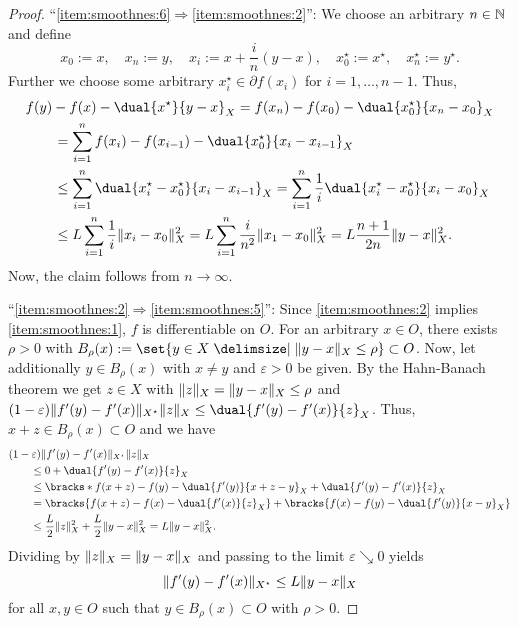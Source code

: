 \documentclass[
	english
]{scrartcl}
\numberwithin{equation}{section} %
\providecommand\given{\nonscript\;\delimsize|\nonscript\;\mathopen{}}
\DeclarePairedDelimiter\norm{\lVert}{\rVert}
\DeclarePairedDelimiter\bracks[]
\newcommand\N{\mathbb{N}}
\newcommand{\dualspace}{^\star}
\begin{document}
\begin{proof}
	``\ref{item:smoothnes:6}$\Rightarrow$\ref{item:smoothnes:2}'':
	We choose an arbitrary $n \in \N$ and define
	\begin{equation*}
		x_0 := x,
		\quad
		x_n := y,
		\quad
		x_i := x + \frac{i}{n} (y - x),
		\quad
		x_0\dualspace := x\dualspace,
		\quad
		x_n\dualspace := y\dualspace
		.
	\end{equation*}
	Further we choose some arbitrary
	$x_i\dualspace \in \partial f(x_i)$ for $i = 1,\ldots, n-1$.
	Thus,
	\begin{align*}
		&f(y) - f(x) - \dual{x\dualspace}{y - x}_X
		=
		f(x_n) - f(x_0) - \dual{x_0\dualspace}{x_n - x_0}_X
		\\&\qquad
		=
		\sum_{i = 1}^n f(x_i) - f(x_{i-1}) - \dual{x_0\dualspace}{x_i - x_{i-1}}_X
		\\&\qquad
		\le
		\sum_{i = 1}^n \dual{x_i\dualspace - x_0\dualspace}{x_i - x_{i-1}}_X
		=
		\sum_{i = 1}^n \frac{1}{i} \dual{x_i\dualspace - x_0\dualspace}{x_i - x_0}_X
		\\&\qquad
		\le
		L \sum_{i = 1}^n \frac{1}{i} \norm{x_i - x_0}_X^2
		=
		L \sum_{i = 1}^n \frac{i}{n^2} \norm{x_1 - x_0}_X^2
		=
		L \frac{n+1}{2 n} \norm{y - x}_X^2
		.
	\end{align*}
	Now, the claim follows from $n \to \infty$.

	``\ref{item:smoothnes:2}$\Rightarrow$\ref{item:smoothnes:5}'':
	Since \ref{item:smoothnes:2} implies \ref{item:smoothnes:1},
	$f$ is differentiable on $O$.
	For an arbitrary $x \in O$, there exists $\rho > 0$
	with $B_\rho(x) := \set{y \in X \given \norm{y - x}_X \le \rho } \subset O$.
	Now, let additionally $y \in B_\rho(x)$ with $x \ne y$ and $\varepsilon > 0$
	be given.
	By the Hahn-Banach theorem we get $z \in X$ with $\norm{z}_X = \norm{y - x}_X \le \rho$
	and
	$(1-\varepsilon) \norm{f'(y) - f'(x)}_{X\dualspace} \norm{z}_X \le \dual{f'(y) - f'(x)}{z}_X$.
	Thus, $x + z \in B_\rho(x) \subset O$
	and we have
	\begin{align*}
		&(1-\varepsilon) \norm{f'(y) - f'(x)}_{X\dualspace} \norm{z}_X
		\\
		&\qquad\le 0 + \dual{f'(y) - f'(x)}{z}_X
		\\
		&\qquad\le
		\bracks*{f(x + z) - f(y) - \dual{f'(y)}{x+z-y}_X} + \dual{f'(y) - f'(x)}{z}_X
		\\
		&\qquad=
		\bracks{f(x + z) - f(x) - \dual{f'(x)}{z}_X}
		+
		\bracks{f(x) - f(y) - \dual{f'(y)}{x - y}_X}
		\\
		&\qquad\le
		\frac L2 \norm{z}_X^2
		+
		\frac L2 \norm{ y - x }_X^2
		=
		L \norm{ y - x }_X^2
		.
	\end{align*}
	Dividing by $\norm{z}_X = \norm{y-x}_X$
	and
	passing to the limit $\varepsilon \searrow 0$ yields
	\begin{equation*}
		\norm{f'(y) - f'(x)}_{X\dualspace}
		\le
		L\norm{y - x}_X
	\end{equation*}
	for all $x,y \in O$
	such that $y \in B_\rho(x) \subset O$
	with $\rho > 0$.


\end{proof}
\end{document}
